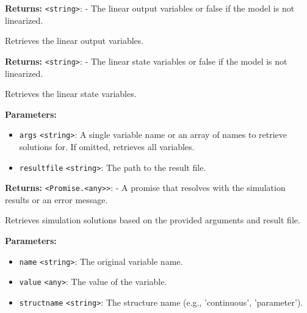 \documentclass[12pt,a4paper]{article}
\begin{document}
\noindent \textbf{Returns:} \texttt{<string>}: - The linear output variables or false if the model is not linearized.

\noindent Retrieves the linear output variables.

\vspace{5mm}
\noindent {}


\noindent \textbf{Returns:} \texttt{<string>}: - The linear state variables or false if the model is not linearized.

\noindent Retrieves the linear state variables.

\vspace{5mm}
\noindent {}


\noindent \textbf{Parameters:}
\begin{itemize}
  \item \texttt{args} \texttt{<string>}: A single variable name or an array of names to retrieve solutions for. If omitted, retrieves all variables.
  \item \texttt{resultfile} \texttt{<string>}: The path to the result file.
\end{itemize}

\noindent \textbf{Returns:} \texttt{<Promise.<any>>}: - A promise that resolves with the simulation results or an error message.

\noindent Retrieves simulation solutions based on the provided arguments and result file.

\vspace{5mm}
\noindent {}


\noindent \textbf{Parameters:}
\begin{itemize}
  \item \texttt{name} \texttt{<string>}: The original variable name.
  \item \texttt{value} \texttt{<any>}: The value of the variable.
  \item \texttt{structname} \texttt{<string>}: The structure name (e.g., 'continuous', 'parameter').
\end{itemize}
\end{document}
